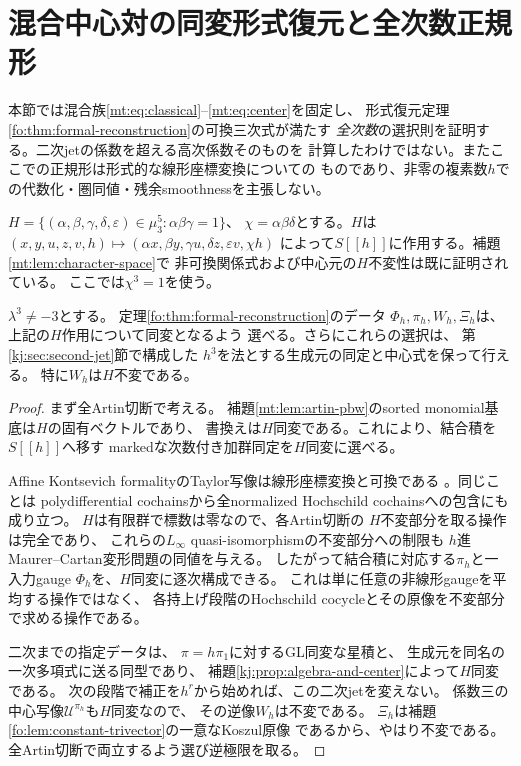 \section{混合中心対の同変形式復元と全次数正規形}
\label{mnf:sec:equivariant-normal-form}

本節では混合族\eqref{mt:eq:classical}--\eqref{mt:eq:center}を固定し、
形式復元定理\ref{fo:thm:formal-reconstruction}の可換三次式が満たす
\emph{全次数}の選択則を証明する。二次jetの係数を超える高次係数そのものを
計算したわけではない。またここでの正規形は形式的な線形座標変換についての
ものであり、非零の複素数$h$での代数化・圏同値・残余smoothnessを主張しない。

$H=\{(\alpha,\beta,\gamma,\delta,\varepsilon)\in\mu_3^5:
\alpha\beta\gamma=1\}$、
$\chi=\alpha\beta\delta$とする。$H$は
$(x,y,u,z,v,h)\mapsto
(\alpha x,\beta y,\gamma u,\delta z,\varepsilon v,\chi h)$
によって$S[[h]]$に作用する。補題\ref{mt:lem:character-space}で
非可換関係式および中心元の$H$不変性は既に証明されている。
ここでは$\chi^3=1$を使う。

\begin{lemma}[同変formalityの選択]
\label{mnf:lem:equivariant-formality}
$\lambda^3\ne-3$とする。
定理\ref{fo:thm:formal-reconstruction}のデータ
$\Phi_h,\pi_h,W_h,\Xi_h$は、上記の$H$作用について同変となるよう
選べる。さらにこれらの選択は、
第\ref{kj:sec:second-jet}節で構成した
$h^3$を法とする生成元の同定と中心式を保って行える。
特に$W_h$は$H$不変である。
\end{lemma}
\begin{proof}
まず全Artin切断で考える。
補題\ref{mt:lem:artin-pbw}のsorted monomial基底は$H$の固有ベクトルであり、
書換えは$H$同変である。これにより、結合積を$S[[h]]$へ移す
markedな次数付き加群同定を$H$同変に選べる。

Affine Kontsevich formalityのTaylor写像は線形座標変換と可換である
\cite[Section~6]{PKontsevich}\cite{MNFDolgushev}。同じことは
polydifferential cochainsから全normalized Hochschild cochainsへの包含にも成り立つ。
$H$は有限群で標数は零なので、各Artin切断の
$H$不変部分を取る操作は完全であり、
これらの$L_\infty$ quasi-isomorphismの不変部分への制限も
$h$進Maurer--Cartan変形問題の同値を与える。
したがって結合積に対応する$\pi_h$と一入力gauge
$\Phi_h$を、$H$同変に逐次構成できる。
これは単に任意の非線形gaugeを平均する操作ではなく、
各持上げ段階のHochschild cocycleとその原像を不変部分で求める操作である。

二次までの指定データは、
$\pi=h\pi_1$に対するGL同変な星積と、
生成元を同名の一次多項式に送る同型であり、
補題\ref{kj:prop:algebra-and-center}によって$H$同変である。
次の段階で補正を$h^r$から始めれば、この二次jetを変えない。
係数三の中心写像$\mathcal U^{\pi_h}$も$H$同変なので、
その逆像$W_h$は不変である。
$\Xi_h$は補題\ref{fo:lem:constant-trivector}の一意なKoszul原像
であるから、やはり不変である。全Artin切断で両立するよう選び逆極限を取る。
\end{proof}

